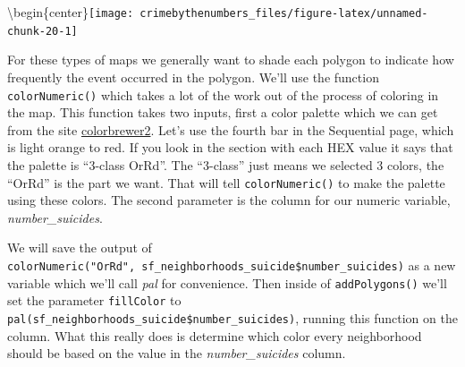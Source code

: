 \documentclass[
  12pt,
  openany]{book}
\newenvironment{Shaded}{\begin{snugshade}}{\end{snugshade}}
\newcommand{\AttributeTok}[1]{\textcolor[rgb]{0.61,0.61,0.61}{#1}}
\newcommand{\DecValTok}[1]{\textcolor[rgb]{0.06,0.06,0.06}{#1}}
\newcommand{\FunctionTok}[1]{\textcolor[rgb]{0,0,0}{#1}}
\newcommand{\NormalTok}[1]{#1}
\newcommand{\OtherTok}[1]{\textcolor[rgb]{0.37,0.37,0.37}{#1}}
\newcommand{\SpecialCharTok}[1]{\textcolor[rgb]{0,0,0}{#1}}
\newcommand{\StringTok}[1]{\textcolor[rgb]{0.5,0.5,0.5}{#1}}
\begin{document}
\textbackslash begin\{center\}\texttt{[image: crimebythenumbers\_files/figure-latex/unnamed-chunk-20-1]}

For these types of maps we generally want to shade each polygon to indicate how frequently the event occurred in the polygon. We'll use the function \texttt{colorNumeric()} which takes a lot of the work out of the process of coloring in the map. This function takes two inputs, first a color palette which we can get from the site \href{http://colorbrewer2.org/\#type=sequential\&scheme=OrRd\&n=3}{colorbrewer2}. Let's use the fourth bar in the Sequential page, which is light orange to red. If you look in the section with each HEX value it says that the palette is ``3-class OrRd''. The ``3-class'' just means we selected 3 colors, the ``OrRd'' is the part we want. That will tell \texttt{colorNumeric()} to make the palette using these colors. The second parameter is the column for our numeric variable, \emph{number\_suicides}.

We will save the output of \texttt{colorNumeric("OrRd",\ sf\_neighborhoods\_suicide\$number\_suicides)} as a new variable which we'll call \emph{pal} for convenience. Then inside of \texttt{addPolygons()} we'll set the parameter \texttt{fillColor} to \texttt{pal(sf\_neighborhoods\_suicide\$number\_suicides)}, running this function on the column. What this really does is determine which color every neighborhood should be based on the value in the \emph{number\_suicides} column.

\begin{Shaded}
\end{Shaded}
\end{document}
